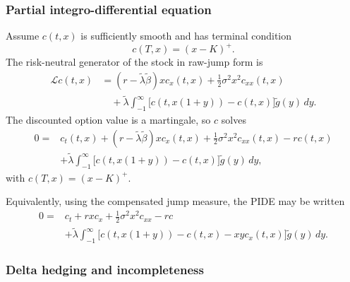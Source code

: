 \subsubsection*{Partial integro-differential equation}

Assume $c(t,x)$ is sufficiently smooth and has terminal condition
\[
c(T,x)=(x-K)^+.
\]
The risk-neutral generator of the stock in raw-jump form is
\[
\begin{aligned}
\mathcal{L}c(t,x)
&=(r-\widetilde\lambda\widetilde\beta)x c_x(t,x)
 +\frac12\sigma^2x^2c_{xx}(t,x)\\
&\quad+\widetilde\lambda
 \int_{-1}^{\infty}
 \bigl[c(t,x(1+y))-c(t,x)\bigr]
 \widetilde g(y)\,dy.
\end{aligned}
\]
The discounted option value is a martingale, so $c$ solves
\[
\boxed{
\begin{aligned}
0={}&c_t(t,x)
 +(r-\widetilde\lambda\widetilde\beta)x c_x(t,x)
 +\frac12\sigma^2x^2c_{xx}(t,x)-rc(t,x)\\
&+\widetilde\lambda
 \int_{-1}^{\infty}
 \bigl[c(t,x(1+y))-c(t,x)\bigr]
 \widetilde g(y)\,dy,
\end{aligned}}
\]
with $c(T,x)=(x-K)^+$.

Equivalently, using the compensated jump measure, the PIDE may be written
\[
\begin{aligned}
0={}&c_t+rx c_x+\frac12\sigma^2x^2c_{xx}-rc\\
&+\widetilde\lambda
 \int_{-1}^{\infty}
 \bigl[c(t,x(1+y))-c(t,x)-xyc_x(t,x)\bigr]
 \widetilde g(y)\,dy.
\end{aligned}
\]

\subsubsection*{Delta hedging and incompleteness}

